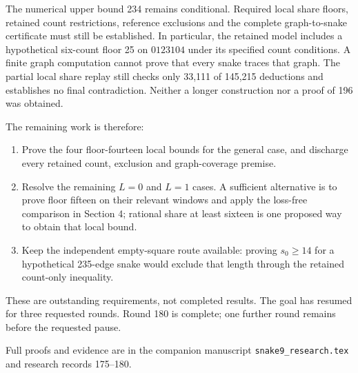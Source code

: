 \documentclass[11pt,a4paper]{article}
\begin{document}
The numerical upper bound 234 remains conditional. Required local share
floors, retained count restrictions, reference exclusions and the complete
graph-to-snake certificate must still be established. In particular, the
retained model includes a hypothetical six-count floor 25 on $0123104$
under its specified count conditions. A finite graph computation cannot
prove that every snake traces that graph. The partial local share replay
still checks only 33,111 of 145,215 deductions and establishes no final
contradiction. Neither a longer construction nor a proof of 196 was obtained.

The remaining work is therefore:
\begin{enumerate}
\item Prove the four floor-fourteen local bounds for the general case,
and discharge every retained count, exclusion and graph-coverage premise.
\item Resolve the remaining $L=0$ and $L=1$ cases. A sufficient alternative
is to prove floor fifteen on their relevant windows and apply the
loss-free comparison in Section 4; rational share at least sixteen is
one proposed way to obtain that local bound.
\item Keep the independent empty-square route available: proving
$s_0\ge14$ for a hypothetical 235-edge snake would exclude that length
through the retained count-only inequality.
\end{enumerate}
These are outstanding requirements, not completed results. The goal has resumed for three requested rounds. Round 180 is complete;
one further round remains before the requested pause.

\smallskip
{\small Full proofs and evidence are in the companion manuscript
\texttt{snake9\_research.tex} and research records 175--180.}
\end{document}
